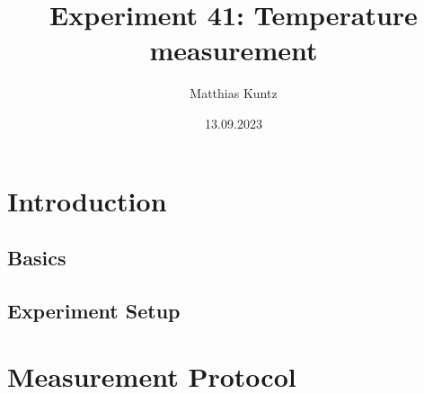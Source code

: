 \documentclass{article}
\title{Experiment 41: Temperature measurement}
\author{Matthias Kuntz}
\date{13.09.2023}
\begin{document}
\maketitle

\section{Introduction}

\subsection{Basics}

\subsection{Experiment Setup}

\newpage

\section{Measurement Protocol}
\end{document}
